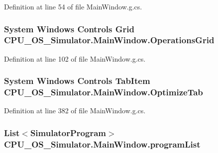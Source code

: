 Definition at line 54 of file Main\+Window.\+g.\+cs.

\hypertarget{class_c_p_u___o_s___simulator_1_1_main_window_ae4f2459995eb2f672c0fd3c2248b79fd}{}
\subsubsection[{Operations\+Grid}]{\setlength{\rightskip}{0pt plus 5cm}System Windows Controls Grid C\+P\+U\+\_\+\+O\+S\+\_\+\+Simulator.\+Main\+Window.\+Operations\+Grid\hspace{0.3cm}{\ttfamily [package]}}\label{class_c_p_u___o_s___simulator_1_1_main_window_ae4f2459995eb2f672c0fd3c2248b79fd}


Definition at line 102 of file Main\+Window.\+g.\+cs.

\hypertarget{class_c_p_u___o_s___simulator_1_1_main_window_a47b1359d9e96abf2b0935eb3392405d4}{}
\subsubsection[{Optimize\+Tab}]{\setlength{\rightskip}{0pt plus 5cm}System Windows Controls Tab\+Item C\+P\+U\+\_\+\+O\+S\+\_\+\+Simulator.\+Main\+Window.\+Optimize\+Tab\hspace{0.3cm}{\ttfamily [package]}}\label{class_c_p_u___o_s___simulator_1_1_main_window_a47b1359d9e96abf2b0935eb3392405d4}


Definition at line 382 of file Main\+Window.\+g.\+cs.

\hypertarget{class_c_p_u___o_s___simulator_1_1_main_window_a48fa4dc074c098338a652dbd6a3434c7}{}
\subsubsection[{program\+List}]{\setlength{\rightskip}{0pt plus 5cm}List$<${\bf Simulator\+Program}$>$ C\+P\+U\+\_\+\+O\+S\+\_\+\+Simulator.\+Main\+Window.\+program\+List\hspace{0.3cm}{\ttfamily [private]}}\label{class_c_p_u___o_s___simulator_1_1_main_window_a48fa4dc074c098338a652dbd6a3434c7}


